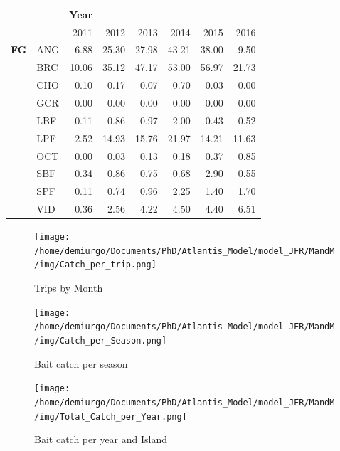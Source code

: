 \documentclass[11pt]{article}
\begin{document}
\begin{center}
\begin{tabular}{llrrrrrr}
              &       &  \textbf{Year}  &         &         &         &         &         \\
              &       &           2011  &   2012  &   2013  &   2014  &   2015  &   2016  \\
\hline
 \textbf{FG}  &  ANG  &           6.88  &  25.30  &  27.98  &  43.21  &  38.00  &   9.50  \\
              &  BRC  &          10.06  &  35.12  &  47.17  &  53.00  &  56.97  &  21.73  \\
              &  CHO  &           0.10  &   0.17  &   0.07  &   0.70  &   0.03  &   0.00  \\
              &  GCR  &           0.00  &   0.00  &   0.00  &   0.00  &   0.00  &   0.00  \\
              &  LBF  &           0.11  &   0.86  &   0.97  &   2.00  &   0.43  &   0.52  \\
              &  LPF  &           2.52  &  14.93  &  15.76  &  21.97  &  14.21  &  11.63  \\
              &  OCT  &           0.00  &   0.03  &   0.13  &   0.18  &   0.37  &   0.85  \\
              &  SBF  &           0.34  &   0.86  &   0.75  &   0.68  &   2.90  &   0.55  \\
              &  SPF  &           0.11  &   0.74  &   0.96  &   2.25  &   1.40  &   1.70  \\
              &  VID  &           0.36  &   2.56  &   4.22  &   4.50  &   4.40  &   6.51  \\
\end{tabular}
\end{center}


 \begin{figure}[htb]
 \centering
 \texttt{[image: /home/demiurgo/Documents/PhD/Atlantis\_Model/model\_JFR/MandM/img/Catch\_per\_trip.png]}
 \caption{Trips by Month}
 \end{figure}
 \begin{figure}[htb]
 \centering
 \texttt{[image: /home/demiurgo/Documents/PhD/Atlantis\_Model/model\_JFR/MandM/img/Catch\_per\_Season.png]}
 \caption{Bait catch per season}
 \end{figure}
 \begin{figure}[htb]
 \centering
 \texttt{[image: /home/demiurgo/Documents/PhD/Atlantis\_Model/model\_JFR/MandM/img/Total\_Catch\_per\_Year.png]}
 \caption{Bait catch per year and Island}
 \end{figure}
\end{document}
